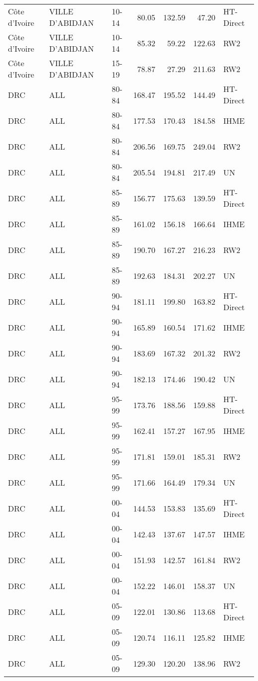 \begin{longtable}{lllrrrl}
  C\^{o}te d'Ivoire & VILLE D'ABIDJAN & 10-14 & 80.05 & 132.59 & 47.20 & HT-Direct \\ 
  C\^{o}te d'Ivoire & VILLE D'ABIDJAN & 10-14 & 85.32 & 59.22 & 122.63 & RW2 \\ 
  C\^{o}te d'Ivoire & VILLE D'ABIDJAN & 15-19 & 78.87 & 27.29 & 211.63 & RW2 \\ 
  DRC & ALL & 80-84 & 168.47 & 195.52 & 144.49 & HT-Direct \\ 
  DRC & ALL & 80-84 & 177.53 & 170.43 & 184.58 & IHME \\ 
  DRC & ALL & 80-84 & 206.56 & 169.75 & 249.04 & RW2 \\ 
  DRC & ALL & 80-84 & 205.54 & 194.81 & 217.49 & UN \\ 
  DRC & ALL & 85-89 & 156.77 & 175.63 & 139.59 & HT-Direct \\ 
  DRC & ALL & 85-89 & 161.02 & 156.18 & 166.64 & IHME \\ 
  DRC & ALL & 85-89 & 190.70 & 167.27 & 216.23 & RW2 \\ 
  DRC & ALL & 85-89 & 192.63 & 184.31 & 202.27 & UN \\ 
  DRC & ALL & 90-94 & 181.11 & 199.80 & 163.82 & HT-Direct \\ 
  DRC & ALL & 90-94 & 165.89 & 160.54 & 171.62 & IHME \\ 
  DRC & ALL & 90-94 & 183.69 & 167.32 & 201.32 & RW2 \\ 
  DRC & ALL & 90-94 & 182.13 & 174.46 & 190.42 & UN \\ 
  DRC & ALL & 95-99 & 173.76 & 188.56 & 159.88 & HT-Direct \\ 
  DRC & ALL & 95-99 & 162.41 & 157.27 & 167.95 & IHME \\ 
  DRC & ALL & 95-99 & 171.81 & 159.01 & 185.31 & RW2 \\ 
  DRC & ALL & 95-99 & 171.66 & 164.49 & 179.34 & UN \\ 
  DRC & ALL & 00-04 & 144.53 & 153.83 & 135.69 & HT-Direct \\ 
  DRC & ALL & 00-04 & 142.43 & 137.67 & 147.57 & IHME \\ 
  DRC & ALL & 00-04 & 151.93 & 142.57 & 161.84 & RW2 \\ 
  DRC & ALL & 00-04 & 152.22 & 146.01 & 158.37 & UN \\ 
  DRC & ALL & 05-09 & 122.01 & 130.86 & 113.68 & HT-Direct \\ 
  DRC & ALL & 05-09 & 120.74 & 116.11 & 125.82 & IHME \\ 
  DRC & ALL & 05-09 & 129.30 & 120.20 & 138.96 & RW2 \\ 

\end{longtable}
